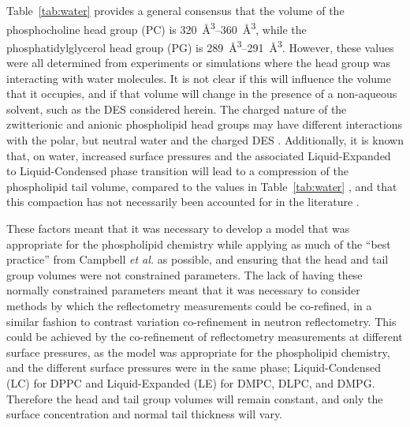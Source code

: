 Table~\ref{tab:water} provides a general consensus that the volume of the phosphocholine head group (PC) is \SIrange{320}{360}{\angstrom\cubed}, while the phosphatidylglycerol head group (PG) is \SIrange{289}{291}{\angstrom\cubed}.
However, these values were all determined from experiments \cite{sun_order_1994,kucerka_determination_2004,balgavy_evaluation_2001,pan_molecular_2012} or simulations \cite{armen_phospholipid_1998,kucerka_scattering_2012} where the head group was interacting with water molecules.
It is not clear if this will influence the volume that it occupies, and if that volume will change in the presence of a non-aqueous solvent, such as the DES considered herein.
The charged nature of the zwitterionic and anionic phospholipid head groups may have different interactions with the polar, but neutral water and the charged DES \cite{sanchez-fernandez_self-assembly_2018}.
Additionally, it is known that, on water, increased surface pressures and the associated Liquid-Expanded to Liquid-Condensed phase transition will lead to a compression of the phospholipid tail volume, compared to the values in Table~\ref{tab:water} \cite{marsh_molecular_2010,small_lateral_1984}, and that this compaction has not necessarily been accounted for in the literature \cite{campbell_structure_2018}.

These factors meant that it was necessary to develop a model that was appropriate for the phospholipid chemistry while applying as much of the ``best practice'' from Campbell \emph{et al.} \cite{campbell_structure_2018} as possible, and ensuring that the head and tail group volumes were not constrained parameters.
The lack of having these normally constrained parameters meant that it was necessary to consider methods by which the reflectometry measurements could be co-refined, in a similar fashion to contrast variation co-refinement in neutron reflectometry.
This could be achieved by the co-refinement of reflectometry measurements at different surface pressures, as the model was appropriate for the phospholipid chemistry, and the different surface pressures were in the same phase; Liquid-Condensed (LC) for DPPC and Liquid-Expanded (LE) for DMPC, DLPC, and DMPG.
Therefore the head and tail group volumes will remain constant, and only the surface concentration and normal tail thickness will vary.


